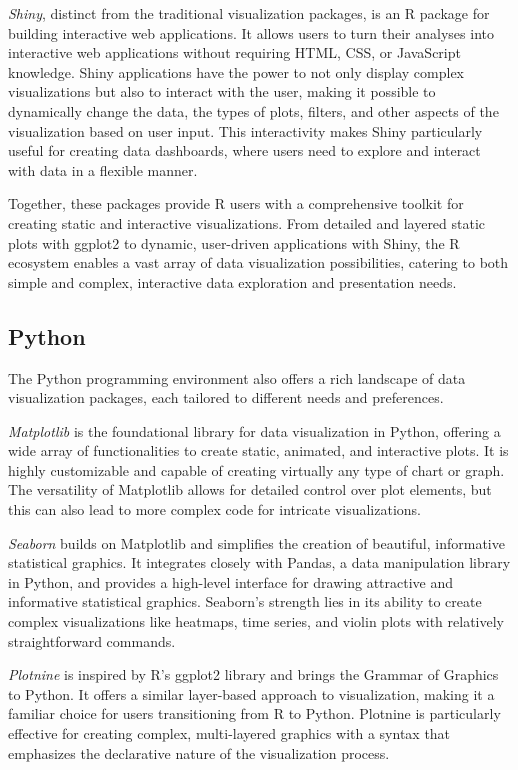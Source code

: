 \emph{Shiny}, distinct from the traditional visualization packages, is an R package for building interactive web applications. It allows users to turn their analyses into interactive web applications without requiring HTML, CSS, or JavaScript knowledge. Shiny applications have the power to not only display complex visualizations but also to interact with the user, making it possible to dynamically change the data, the types of plots, filters, and other aspects of the visualization based on user input. This interactivity makes Shiny particularly useful for creating data dashboards, where users need to explore and interact with data in a flexible manner.

Together, these packages provide R users with a comprehensive toolkit for creating static and interactive visualizations. From detailed and layered static plots with ggplot2 to dynamic, user-driven applications with Shiny, the R ecosystem enables a vast array of data visualization possibilities, catering to both simple and complex, interactive data exploration and presentation needs.

\subsection*{Python}

The Python programming environment also offers a rich landscape of data visualization packages, each tailored to different needs and preferences.

\emph{Matplotlib} is the foundational library for data visualization in Python, offering a wide array of functionalities to create static, animated, and interactive plots. It is highly customizable and capable of creating virtually any type of chart or graph. The versatility of Matplotlib allows for detailed control over plot elements, but this can also lead to more complex code for intricate visualizations.

\emph{Seaborn} builds on Matplotlib and simplifies the creation of beautiful, informative statistical graphics. It integrates closely with Pandas, a data manipulation library in Python, and provides a high-level interface for drawing attractive and informative statistical graphics. Seaborn's strength lies in its ability to create complex visualizations like heatmaps, time series, and violin plots with relatively straightforward commands.

\emph{Plotnine} is inspired by R's ggplot2 library and brings the Grammar of Graphics to Python. It offers a similar layer-based approach to visualization, making it a familiar choice for users transitioning from R to Python. Plotnine is particularly effective for creating complex, multi-layered graphics with a syntax that emphasizes the declarative nature of the visualization process.

